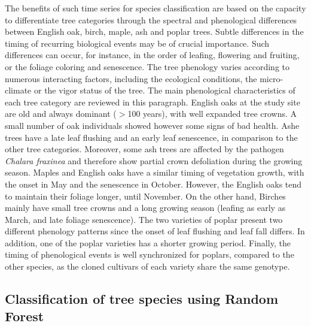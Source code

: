 \documentclass[remotesensing,article,submit,moreauthors,pdftex,12pt,a4paper]{mdpi} %
\begin{document}
The benefits of such time series for species classification are based on the capacity to differentiate tree categories through the spectral and phenological differences between English oak, birch, maple, ash and poplar trees. 
Subtle differences in the timing of recurring biological events may be of crucial importance. Such differences can occur, for instance, in the order of leafing, flowering and fruiting, or the foliage coloring and senescence. 
The tree phenology varies according to numerous interacting factors, including the ecological conditions, the micro-climate or the vigor status of the tree.
The main phenological characteristics of each tree category are reviewed in this paragraph. 
English oaks at the study site are old and always dominant ($>$100 years), with well expanded tree crowns.
A small number of oak individuals showed however some signs of bad health. 
Ashe trees have a late leaf flushing and an early leaf senescence, in comparison to the other tree categories. 
Moreover, some ash trees are affected by the pathogen \textit{Chalara fraxinea} \cite{husson_chalara_2011} and therefore show partial crown defoliation during the growing season. 
Maples and English oaks have a similar timing of vegetation growth, with the onset in May and the senescence in October. However, the English oaks tend to maintain their foliage longer, until November. 
On the other hand, Birches mainly have small tree crowns and a long growing season (leafing as early as March, and late foliage senescence). 
The two varieties of poplar present two different phenology patterns since the onset of leaf flushing and leaf fall differs. 
In addition, one of the poplar varieties has a shorter growing period.
Finally, the timing of phenological events is well synchronized for poplars, compared to the other species, as the cloned cultivars of each variety share the same genotype.


\subsection{Classification of tree species using Random Forest}
\end{document}
